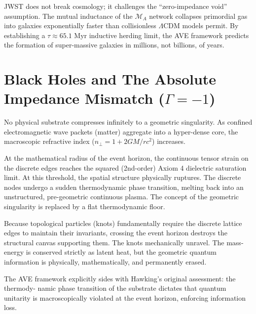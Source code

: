 JWST does not break cosmology; it challenges the ``zero-impedance void'' assumption. The mutual inductance of the $\mathcal{M}_A$ network collapses primordial gas into galaxies exponentially faster than collisionless $\Lambda$CDM models permit. By establishing a $\tau \approx 65.1$ Myr inductive herding limit, the AVE framework predicts the formation of super-massive galaxies in millions, not billions, of years.

\section{Black Holes and The Absolute Impedance Mismatch ($\Gamma = -1$)}

No physical substrate compresses infinitely to a geometric singularity. As confined electromagnetic wave packets (matter) aggregate into a hyper-dense core, the macroscopic refractive index ($n_{\perp}=1+2GM/rc^{2}$) increases.

At the mathematical radius of the event horizon, the continuous tensor strain on
the discrete edges reaches the squared (2nd-order) Axiom 4 dielectric saturation limit. At this
threshold, the spatial structure physically ruptures. The discrete nodes undergo a sudden
thermodynamic phase transition, melting back into an unstructured, pre-geometric continuous
plasma. The concept of the geometric singularity is replaced by a flat thermodynamic floor.

Because topological particles (knots) fundamentally require the discrete lattice edges to
maintain their invariants, crossing the event horizon destroys the structural canvas supporting
them. The knots mechanically unravel. The mass-energy is conserved strictly as latent heat,
but the geometric quantum information is physically, mathematically, and permanently erased.

The AVE framework explicitly sides with Hawking's original assessment: the thermody-
namic phase transition of the substrate dictates that quantum unitarity is macroscopically
violated at the event horizon, enforcing information loss.